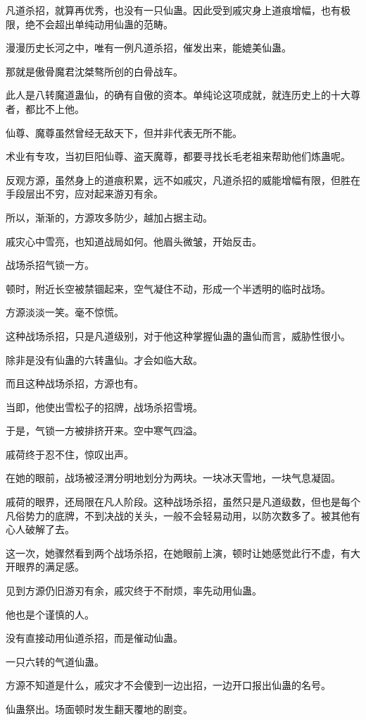 \begin{this_body}
凡道杀招，就算再优秀，也没有一只仙蛊。因此受到戚灾身上道痕增幅，也有极限，绝不会超出单纯动用仙蛊的范畴。

漫漫历史长河之中，唯有一例凡道杀招，催发出来，能媲美仙蛊。

那就是傲骨魔君沈桀骜所创的白骨战车。

此人是八转魔道蛊仙，的确有自傲的资本。单纯论这项成就，就连历史上的十大尊者，都比不上他。

仙尊、魔尊虽然曾经无敌天下，但并非代表无所不能。

术业有专攻，当初巨阳仙尊、盗天魔尊，都要寻找长毛老祖来帮助他们炼蛊呢。

反观方源，虽然身上的道痕积累，远不如戚灾，凡道杀招的威能增幅有限，但胜在手段层出不穷，应对起来游刃有余。

所以，渐渐的，方源攻多防少，越加占据主动。

戚灾心中雪亮，也知道战局如何。他眉头微皱，开始反击。

战场杀招气锁一方。

顿时，附近长空被禁锢起来，空气凝住不动，形成一个半透明的临时战场。

方源淡淡一笑。毫不惊慌。

这种战场杀招，只是凡道级别，对于他这种掌握仙蛊的蛊仙而言，威胁性很小。

除非是没有仙蛊的六转蛊仙。才会如临大敌。

而且这种战场杀招，方源也有。

当即，他使出雪松子的招牌，战场杀招雪境。

于是，气锁一方被排挤开来。空中寒气四溢。

戚荷终于忍不住，惊叹出声。

在她的眼前，战场被泾渭分明地划分为两块。一块冰天雪地，一块气息凝固。

戚荷的眼界，还局限在凡人阶段。这种战场杀招，虽然只是凡道级数，但也是每个凡俗势力的底牌，不到决战的关头，一般不会轻易动用，以防次数多了。被其他有心人破解了去。

这一次，她骤然看到两个战场杀招，在她眼前上演，顿时让她感觉此行不虚，有大开眼界的满足感。

见到方源仍旧游刃有余，戚灾终于不耐烦，率先动用仙蛊。

他也是个谨慎的人。

没有直接动用仙道杀招，而是催动仙蛊。

一只六转的气道仙蛊。

方源不知道是什么，戚灾才不会傻到一边出招，一边开口报出仙蛊的名号。

仙蛊祭出。场面顿时发生翻天覆地的剧变。


\end{this_body}
